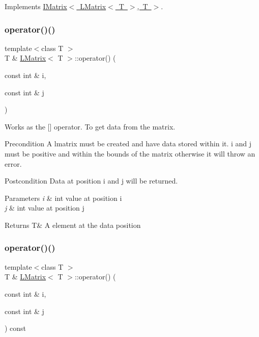 Implements \mbox{\hyperlink{class_i_matrix}{I\+Matrix$<$ L\+Matrix$<$ T $>$, T $>$}}.

\mbox{\label{class_l_matrix_aa0b1bc37d56538dbdd4fcb3b88dcc3ec}} 
\subsubsection{\texorpdfstring{operator()()}{operator()()}\hspace{0.1cm}{\footnotesize\ttfamily [1/2]}}
{\footnotesize\ttfamily template$<$class T $>$ \\
T \& \mbox{\hyperlink{class_l_matrix}{L\+Matrix}}$<$ T $>$\+::operator() (\begin{DoxyParamCaption}\item[{const int \&}]{i,  }\item[{const int \&}]{j }\end{DoxyParamCaption})}



Works as the \mbox{[}\mbox{]} operator. To get data from the matrix. 

\begin{DoxyPrecond}{Precondition}
A lmatrix must be created and have data stored within it. i and j must be positive and within the bounds of the matrix otherwise it will throw an error. 
\end{DoxyPrecond}
\begin{DoxyPostcond}{Postcondition}
Data at position i and j will be returned.
\end{DoxyPostcond}

\begin{DoxyParams}{Parameters}
{\em i} & int value at position i \\
\hline
{\em j} & int value at position j \\
\hline
\end{DoxyParams}
\begin{DoxyReturn}{Returns}
T\& A element at the data position 
\end{DoxyReturn}
\mbox{\label{class_l_matrix_ae9d404d99117892edd2fbfddfaf929f5}} 
\subsubsection{\texorpdfstring{operator()()}{operator()()}\hspace{0.1cm}{\footnotesize\ttfamily [2/2]}}
{\footnotesize\ttfamily template$<$class T $>$ \\
T \& \mbox{\hyperlink{class_l_matrix}{L\+Matrix}}$<$ T $>$\+::operator() (\begin{DoxyParamCaption}\item[{const int \&}]{i,  }\item[{const int \&}]{j }\end{DoxyParamCaption}) const}



